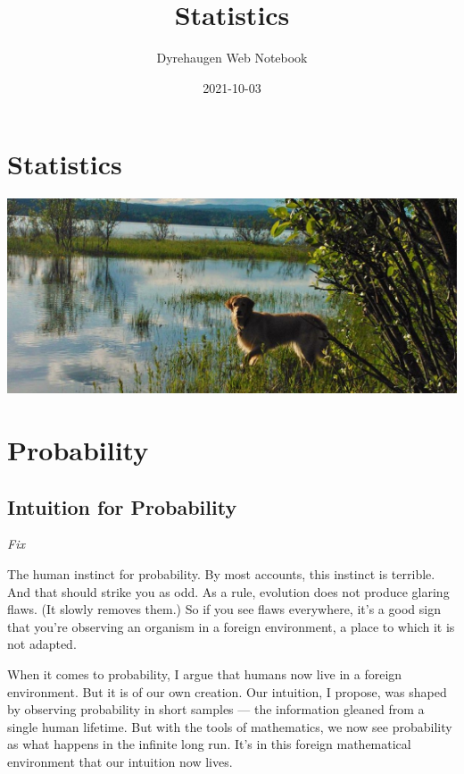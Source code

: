 \documentclass[
]{book}
\title{Statistics}
\author{Dyrehaugen Web Notebook}
\date{2021-10-03}
\begin{document}
\maketitle

{
\setcounter{tocdepth}{1}
\tableofcontents
}
\hypertarget{statistics}{%
\chapter{Statistics}\label{statistics}}

\includegraphics{fig/zelda.jpg}

\hypertarget{probability}{%
\chapter{Probability}\label{probability}}

\hypertarget{intuition-for-probability}{%
\section{Intuition for Probability}\label{intuition-for-probability}}

\emph{Fix}

The human instinct for probability. By most accounts, this instinct is terrible. And that should strike you as odd. As a rule, evolution does not produce glaring flaws. (It slowly removes them.) So if you see flaws everywhere, it's a good sign that you're observing an organism in a foreign environment, a place to which it is not adapted.

When it comes to probability, I argue that humans now live in a foreign environment. But it is of our own creation. Our intuition, I propose, was shaped by observing probability in short samples --- the information gleaned from a single human lifetime. But with the tools of mathematics, we now see probability as what happens in the infinite long run. It's in this foreign mathematical environment that our intuition now lives.
\end{document}
